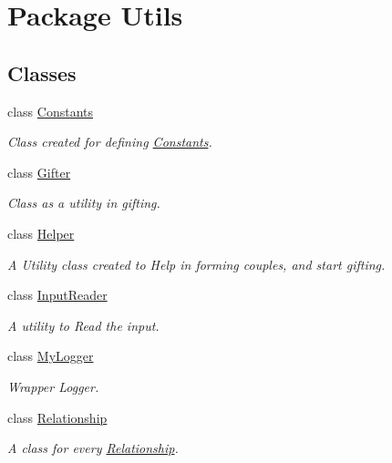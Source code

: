 \hypertarget{namespace_utils}{}\section{Package Utils}
\label{namespace_utils}
\subsection*{Classes}
\begin{DoxyCompactItemize}
\item 
class \hyperlink{class_utils_1_1_constants}{Constants}
\begin{DoxyCompactList}\small\item\em Class created for defining \hyperlink{class_utils_1_1_constants}{Constants}. \end{DoxyCompactList}\item 
class \hyperlink{class_utils_1_1_gifter}{Gifter}
\begin{DoxyCompactList}\small\item\em Class as a utility in gifting. \end{DoxyCompactList}\item 
class \hyperlink{class_utils_1_1_helper}{Helper}
\begin{DoxyCompactList}\small\item\em A Utility class created to Help in forming couples, and start gifting. \end{DoxyCompactList}\item 
class \hyperlink{class_utils_1_1_input_reader}{Input\+Reader}
\begin{DoxyCompactList}\small\item\em A utility to Read the input. \end{DoxyCompactList}\item 
class \hyperlink{class_utils_1_1_my_logger}{My\+Logger}
\begin{DoxyCompactList}\small\item\em Wrapper Logger. \end{DoxyCompactList}\item 
class \hyperlink{class_utils_1_1_relationship}{Relationship}
\begin{DoxyCompactList}\small\item\em A class for every \hyperlink{class_utils_1_1_relationship}{Relationship}. \end{DoxyCompactList}\end{DoxyCompactItemize}
